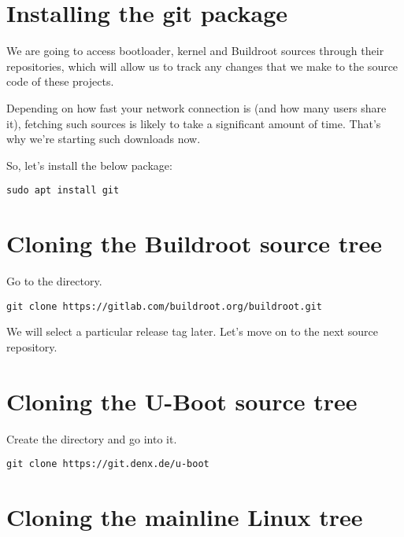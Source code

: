 
\section{Installing the git package}

We are going to access bootloader, kernel and Buildroot sources through
their  repositories, which will allow us to track any changes
that we make to the source code of these projects.

Depending on how fast your network connection is (and how many users
share it), fetching such sources is likely to take a significant amount
of time. That's why we're starting such downloads now.

So, let's install the below package:

\begin{verbatim}
sudo apt install git
\end{verbatim}

\section{Cloning the Buildroot source tree}

Go to the  directory.

\begin{verbatim}
git clone https://gitlab.com/buildroot.org/buildroot.git
\end{verbatim}

We will select a particular release tag later. Let's move on to the next
source repository.

\section{Cloning the U-Boot source tree}

Create the  directory and go
into it.

\begin{verbatim}
git clone https://git.denx.de/u-boot
\end{verbatim}

\section{Cloning the mainline Linux tree}

